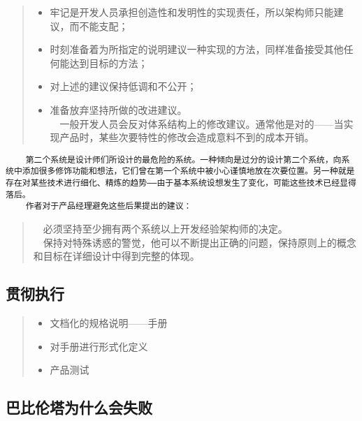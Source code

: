 \documentclass[11pt]{article}
\providecommand{\tightlist}{%
      \setlength{\itemsep}{0pt}\setlength{\parskip}{0pt}}
\begin{document}
\begin{quote}
\begin{itemize}
\tightlist
\item
  牢记是开发人员承担创造性和发明性的实现责任，所以架构师只能建议，而不能支配；\\
\item
  时刻准备着为所指定的说明建议一种实现的方法，同样准备接受其他任何能达到目标的方法；\\
\item
  对上述的建议保持低调和不公开；\\
\item
  准备放弃坚持所做的改进建议。\\
    一般开发人员会反对体系结构上的修改建议。通常他是对的------当实现产品时，某些次要特性的修改会造成意料不到的成本开销。
\end{itemize}
\end{quote}

\begin{verbatim}
    第二个系统是设计师们所设计的最危险的系统。一种倾向是过分的设计第二个系统，向系统中添加很多修饰功能和想法，它们曾在第一个系统中被小心谨慎地放在次要位置。另一种就是存在对某些技术进行细化、精炼的趋势——由于基本系统设想发生了变化，可能这些技术已经显得落后。
    作者对于产品经理避免这些后果提出的建议：
\end{verbatim}

\begin{quote}
  必须坚持至少拥有两个系统以上开发经验架构师的决定。\\
  保持对特殊诱惑的警觉，他可以不断提出正确的问题，保持原则上的概念和目标在详细设计中得到完整的体现。
\end{quote}

\hypertarget{ux8d2fux5f7bux6267ux884c}{%
\subsection{贯彻执行}\label{ux8d2fux5f7bux6267ux884c}}

\begin{quote}
\begin{itemize}
\tightlist
\item
  文档化的规格说明------手册
\item
  对手册进行形式化定义
\item
  产品测试
\end{itemize}
\end{quote}

\hypertarget{ux5df4ux6bd4ux4f26ux5854ux4e3aux4ec0ux4e48ux4f1aux5931ux8d25}{%
\subsection{巴比伦塔为什么会失败}\label{ux5df4ux6bd4ux4f26ux5854ux4e3aux4ec0ux4e48ux4f1aux5931ux8d25}}
\end{document}
